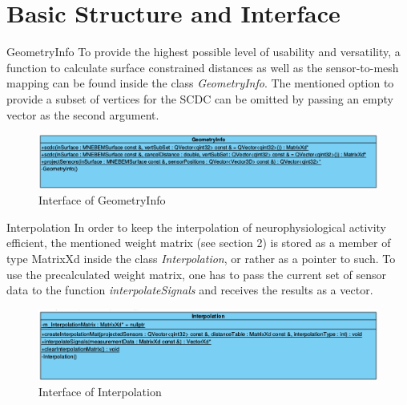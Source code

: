 \section{Basic Structure and Interface}

\begin{aims}
	\item[GeometryInfo] To provide the highest possible level of usability and versatility, a function to calculate surface constrained distances as well as the sensor-to-mesh mapping can be found inside the class \textit{GeometryInfo}. The mentioned option to provide a subset of vertices for the SCDC can be omitted by passing an empty vector as the second argument. 

\begin{figure}[h]
	\begin{center}
		\includegraphics[width=16cm]{figures/geometryinfoclassdiagram.png}
		\caption{Interface of GeometryInfo}
	\end{center}
\end{figure}

\item[Interpolation] In order to keep the interpolation of neurophysiological activity efficient, the mentioned weight matrix (see section 2) is stored as a member of type MatrixXd inside the class \textit{Interpolation}, or rather as a pointer to such.
To use the precalculated weight matrix, one has to pass the current set of sensor data to the function \textit{interpolateSignals} and receives the results as a vector.

\begin{figure}[h]
	\begin{center}
		\includegraphics[width=16cm]{figures/interpolationclassdiagram.png}
		\caption{Interface of Interpolation}
	\end{center}
\end{figure}

\clearpage


\end{aims}
